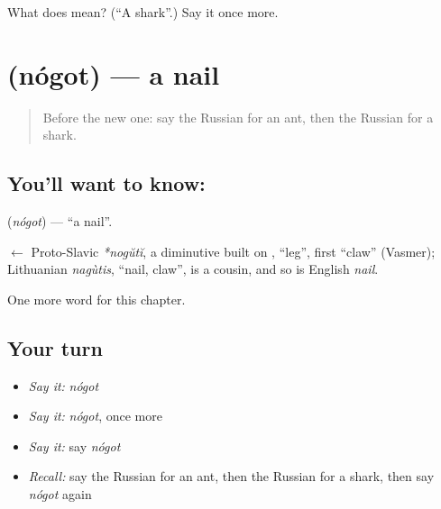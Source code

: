 \begin{tcolorbox}[breakable,colback=teal!4,colframe=teal!35!black,title={Before you move on}]
What does  mean? (\textquotedblleft{}A shark\textquotedblright{}.) Say it once more.
\end{tcolorbox}
\section[\texorpdfstring{\ru{ноготь} (nógot)}{ноготь (nógot)}]{ (nógot) — a nail}

\label{lesson:RU-C121-nail-2}



\begin{quote}
Before the new one: say the Russian for an ant, then the Russian for a shark.
\end{quote}

\subsection*{You'll want to know: }
\textbf{} (\emph{nógot}) — \textquotedblleft{}a nail\textquotedblright{}.

\begin{cousinweb}
\textbf{} $\leftarrow$ Proto-Slavic \emph{*nogŭtĭ}, a diminutive built on \emph{}, \textquotedblleft{}leg\textquotedblright{}, first \textquotedblleft{}claw\textquotedblright{} (Vasmer); Lithuanian \emph{nagùtis}, \textquotedblleft{}nail, claw\textquotedblright{}, is a cousin, and so is English \emph{nail}.
\end{cousinweb}

\begin{grammarlens}[title={What you've built}]
One more word for this chapter.
\end{grammarlens}

\subsection*{Your turn}
\begin{itemize}
\raggedright
  \item \emph{Say it:} \emph{nógot}
  \item \emph{Say it:} \emph{nógot}, once more
  \item \emph{Say it:} say \emph{nógot}
  \item \emph{Recall:} say the Russian for an ant, then the Russian for a shark, then say \emph{nógot} again
\end{itemize}

